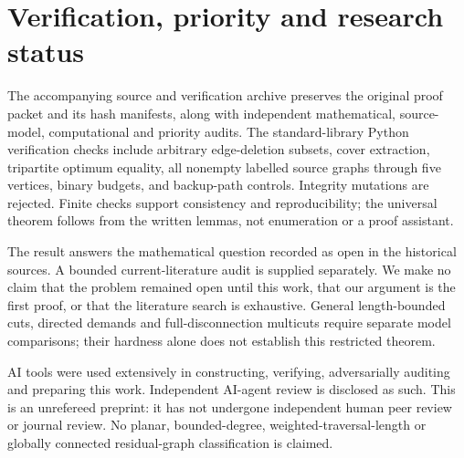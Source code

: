 \documentclass[11pt]{article}
\begin{document}
\section{Verification, priority and research status}
The accompanying source and verification archive preserves the original proof
packet and its hash manifests, along with independent mathematical, source-model,
computational and priority audits. The standard-library Python verification
checks include arbitrary edge-deletion subsets, cover extraction, tripartite
optimum equality, all nonempty labelled source graphs through five vertices,
binary budgets, and backup-path controls. Integrity mutations are rejected.
Finite checks support consistency and reproducibility; the universal theorem
follows from the written lemmas, not enumeration or a proof assistant.

The result answers the mathematical question recorded as open in the historical
sources. A bounded current-literature audit is supplied separately. We make no
claim that the problem remained open until this work, that our argument is the
first proof, or that the literature search is exhaustive. General length-bounded
cuts, directed demands and full-disconnection multicuts require separate model
comparisons; their hardness alone does not establish this restricted theorem.

AI tools were used extensively in constructing, verifying, adversarially auditing
and preparing this work. Independent AI-agent review is disclosed as such.
This is an unrefereed preprint: it has not undergone independent human peer
review or journal review. No planar, bounded-degree, weighted-traversal-length
or globally connected residual-graph classification is claimed.
\end{document}
